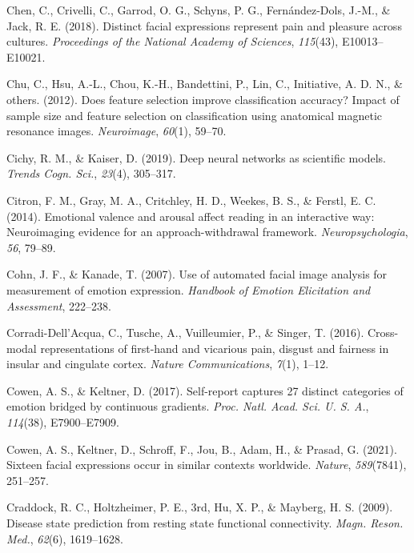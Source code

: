 \documentclass[11pt,american,]{memoir} %
\begin{document}
\leavevmode\hypertarget{ref-chen2018distinct}{}%
Chen, C., Crivelli, C., Garrod, O. G., Schyns, P. G., Fernández-Dols, J.-M., \& Jack, R. E. (2018). Distinct facial expressions represent pain and pleasure across cultures. \emph{Proceedings of the National Academy of Sciences}, \emph{115}(43), E10013--E10021.

\leavevmode\hypertarget{ref-chu2012does}{}%
Chu, C., Hsu, A.-L., Chou, K.-H., Bandettini, P., Lin, C., Initiative, A. D. N., \& others. (2012). Does feature selection improve classification accuracy? Impact of sample size and feature selection on classification using anatomical magnetic resonance images. \emph{Neuroimage}, \emph{60}(1), 59--70.

\leavevmode\hypertarget{ref-Cichy2019-zf}{}%
Cichy, R. M., \& Kaiser, D. (2019). Deep neural networks as scientific models. \emph{Trends Cogn. Sci.}, \emph{23}(4), 305--317.

\leavevmode\hypertarget{ref-citron2014emotional}{}%
Citron, F. M., Gray, M. A., Critchley, H. D., Weekes, B. S., \& Ferstl, E. C. (2014). Emotional valence and arousal affect reading in an interactive way: Neuroimaging evidence for an approach-withdrawal framework. \emph{Neuropsychologia}, \emph{56}, 79--89.

\leavevmode\hypertarget{ref-Cohn2007-xe}{}%
Cohn, J. F., \& Kanade, T. (2007). Use of automated facial image analysis for measurement of emotion expression. \emph{Handbook of Emotion Elicitation and Assessment}, 222--238.

\leavevmode\hypertarget{ref-corradi2016cross}{}%
Corradi-Dell'Acqua, C., Tusche, A., Vuilleumier, P., \& Singer, T. (2016). Cross-modal representations of first-hand and vicarious pain, disgust and fairness in insular and cingulate cortex. \emph{Nature Communications}, \emph{7}(1), 1--12.

\leavevmode\hypertarget{ref-Cowen2017-vz}{}%
Cowen, A. S., \& Keltner, D. (2017). Self-report captures 27 distinct categories of emotion bridged by continuous gradients. \emph{Proc. Natl. Acad. Sci. U. S. A.}, \emph{114}(38), E7900--E7909.

\leavevmode\hypertarget{ref-Cowen2021-ld}{}%
Cowen, A. S., Keltner, D., Schroff, F., Jou, B., Adam, H., \& Prasad, G. (2021). Sixteen facial expressions occur in similar contexts worldwide. \emph{Nature}, \emph{589}(7841), 251--257.

\leavevmode\hypertarget{ref-Craddock2009-kz}{}%
Craddock, R. C., Holtzheimer, P. E., 3rd, Hu, X. P., \& Mayberg, H. S. (2009). Disease state prediction from resting state functional connectivity. \emph{Magn. Reson. Med.}, \emph{62}(6), 1619--1628.
\end{document}
